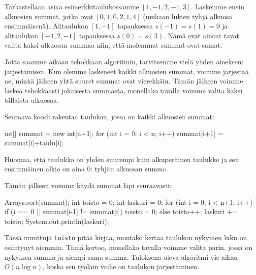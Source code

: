 Tarkastellaan asiaa esimerkkitaulukossamme $[1,-1,2,-1,3]$.
Laskemme ensin alkuosien summat, jotka ovat $[0,1,0,2,1,4]$
(mukaan lukien tyhjä alkuosa ensimmäisenä).
Alitaulukon $[1,-1]$ tapauksessa $s(-1)=s(1)=0$ ja
alitaulukon $[-1,2,-1]$ tapauksessa $s(0)=s(3)$.
Nämä ovat ainoat tavat valita kaksi alkuosan summaa niin,
että molemmat summat ovat samat.

Jotta saamme aikaan tehokkaan algoritmin, tarvitsemme vielä
yhden aineksen: järjestämisen.
Kun olemme laskeneet kaikki alkuosien summat,
voimme järjestää ne, minkä jälkeen yhtä suuret summat
ovat vierekkäin. Tämän jälkeen voimme laskea tehokkaasti
jokaisesta summasta, monellako tavalla voimme valita
kaksi tällaista alkuosaa.

Seuraava koodi rakentaa taulukon, jossa on kaikki alkuosien summat:

\begin{code}
int[] summat = new int[n+1];
for (int i = 0; i < n; i++) {
    summat[i+1] = summat[i]+taulu[i];
}
\end{code}

Huomaa, että taulukko on yhden suurempi kuin alkuperäinen taulukko
ja sen ensimmäinen alkio on aina $0$: tyhjän alkuosan summa.

Tämän jälkeen voimme käydä summat läpi seuraavasti:

\begin{code}
Arrays.sort(summat);
int toisto = 0;
int laskuri = 0;
for (int i = 0; i < n+1; i++) {
    if (i == 0 || summat[i-1] != summat[i]) {
        toisto = 0;
    } else {
        toisto++;
    }
    laskuri += toisto;
}
System.out.println(laskuri);
\end{code}

Tässä muuttuja \texttt{toisto} pitää kirjaa, montako kertaa
taulukon nykyinen luku on esiintynyt aiemmin.
Tämä kertoo, monellako tavalla voimme valita parin,
jossa on nykyinen summa ja aiempi sama summa.
Tuloksena oleva algoritmi vie aikaa $O(n \log n)$,
koska sen työläin vaihe on taulukon järjestäminen.
